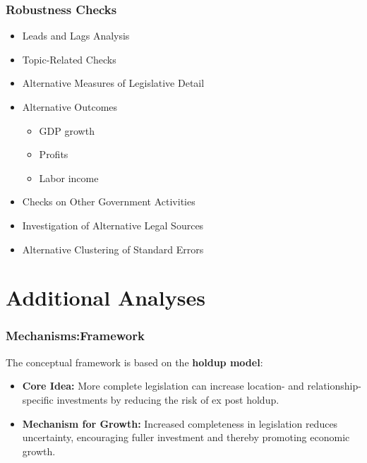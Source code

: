 \documentclass{beamer}
\begin{document}
\begin{frame}
    \frametitle{Robustness Checks}
    \begin{itemize}
        \item Leads and Lags Analysis
        \item Topic-Related Checks
        \item Alternative Measures of Legislative Detail
        \item Alternative Outcomes
        \begin{itemize}
            \item GDP growth
            \item Profits
            \item Labor income
        \end{itemize}
        \item Checks on Other Government Activities
        \item Investigation of Alternative Legal Sources
        \item Alternative Clustering of Standard Errors 
    \end{itemize}
\end{frame}
\section{Additional Analyses}

\begin{frame}
    \frametitle{Mechanisms:Framework}
    \footnotesize
    The conceptual framework is based on the \textbf{holdup model}:
    \begin{itemize}
        \item \textbf{Core Idea:} More complete legislation can increase location- and relationship-specific investments by reducing the risk of ex post holdup.
        \item \textbf{Mechanism for Growth:} Increased completeness in legislation reduces uncertainty, encouraging fuller investment and thereby promoting economic growth.
      
    \end{itemize}
\end{frame}
\end{document}
